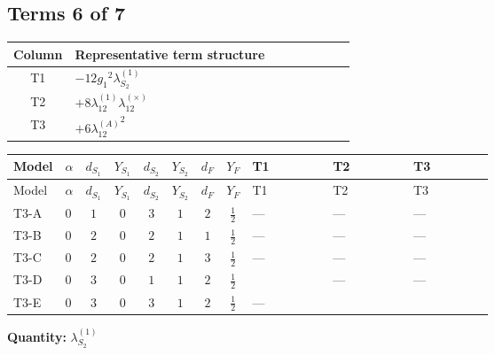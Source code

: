 \documentclass[8pt]{article}
\begin{document}
\begin{landscape}
\subsection*{Terms 6 of 7}
\begin{center}
\begin{tabular}{@{}c >{\raggedright\arraybackslash}p{0.82\linewidth}@{}}
\toprule
Column & Representative term structure \\
\midrule
T1 & \(\displaystyle -12 {g_1}^2 {\lambda_{S_2}^{(1)}}\) \\
\midrule
T2 & \(\displaystyle +8 {\lambda_{12}^{(1)}} {\lambda_{12}^{(\times)}}\) \\
\midrule
T3 & \(\displaystyle +6 {\lambda_{12}^{(A)}}^2\) \\
\midrule
\bottomrule
\end{tabular}
\end{center}
\smallskip
\tiny
\begin{longtable}{@{}llcccccc >{\raggedright\arraybackslash}p{0.21\linewidth} >{\raggedright\arraybackslash}p{0.21\linewidth} >{\raggedright\arraybackslash}p{0.21\linewidth}@{}}
\toprule
Model & $\alpha$ & $d_{S_1}$ & $Y_{S_1}$ & $d_{S_2}$ & $Y_{S_2}$ & $d_F$ & $Y_F$ & T1 & T2 & T3 \\
\midrule
\endfirsthead
\toprule
Model & $\alpha$ & $d_{S_1}$ & $Y_{S_1}$ & $d_{S_2}$ & $Y_{S_2}$ & $d_F$ & $Y_F$ & T1 & T2 & T3 \\
\midrule
\endhead
T3-A & $0$ & $1$ & $0$ & $3$ & $1$ & $2$ & $\frac{1}{2}$ & --- & --- & --- \\
\midrule
T3-B & $0$ & $2$ & $0$ & $2$ & $1$ & $1$ & $\frac{1}{2}$ & --- & --- & --- \\
\midrule
T3-C & $0$ & $2$ & $0$ & $2$ & $1$ & $3$ & $\frac{1}{2}$ & --- & --- & --- \\
\midrule
T3-D & $0$ & $3$ & $0$ & $1$ & $1$ & $2$ & $\frac{1}{2}$ & \scriptsize\adjustbox{max width=\linewidth}{$\begin{gathered} -12 {g_1}^2 {\lambda_{S_2}^{(1)}}\end{gathered}$} & --- & --- \\
\midrule
T3-E & $0$ & $3$ & $0$ & $3$ & $1$ & $2$ & $\frac{1}{2}$ & --- & \scriptsize\adjustbox{max width=\linewidth}{$\begin{gathered} +8 {\lambda_{12}^{(1)}} {\lambda_{12}^{(\times)}}\end{gathered}$} & \scriptsize\adjustbox{max width=\linewidth}{$\begin{gathered} +6 {\lambda_{12}^{(A)}}^2\end{gathered}$} \\
\midrule
\bottomrule
\end{longtable}
\clearpage
\noindent\textbf{Quantity: }$\lambda_{S_2}^{(1)}$\par\smallskip

\end{landscape}
\end{document}
